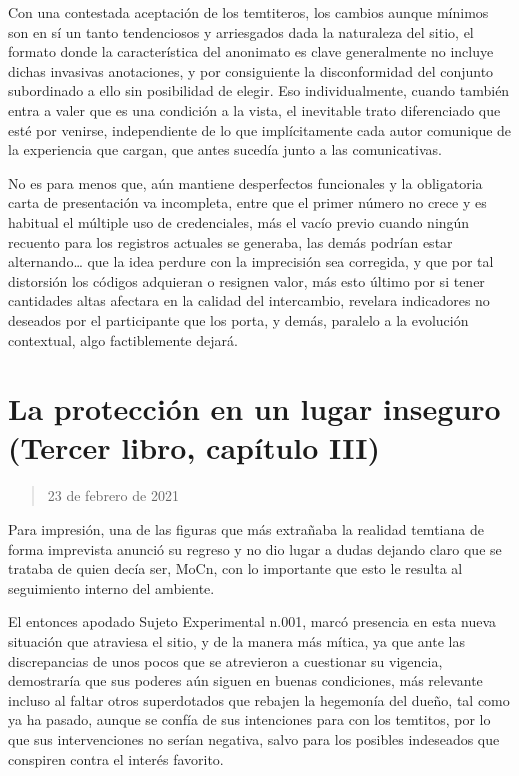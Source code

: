 \documentclass[
]{book}
\begin{document}
Con una contestada aceptación de los temtiteros, los cambios aunque mínimos son en sí un tanto tendenciosos y arriesgados dada la naturaleza del sitio, el formato donde la característica del anonimato es clave generalmente no incluye dichas invasivas anotaciones, y por consiguiente la disconformidad del conjunto subordinado a ello sin posibilidad de elegir. Eso individualmente, cuando también entra a valer que es una condición a la vista, el inevitable trato diferenciado que esté por venirse, independiente de lo que implícitamente cada autor comunique de la experiencia que cargan, que antes sucedía junto a las comunicativas.

No es para menos que, aún mantiene desperfectos funcionales y la obligatoria carta de presentación va incompleta, entre que el primer número no crece y es habitual el múltiple uso de credenciales, más el vacío previo cuando ningún recuento para los registros actuales se generaba, las demás podrían estar alternando\ldots{} que la idea perdure con la imprecisión sea corregida, y que por tal distorsión los códigos adquieran o resignen valor, más esto último por si tener cantidades altas afectara en la calidad del intercambio, revelara indicadores no deseados por el participante que los porta, y demás, paralelo a la evolución contextual, algo factiblemente dejará.

\hypertarget{la-protecciuxf3n-en-un-lugar-inseguro-tercer-libro-capuxedtulo-iii}{%
\section{La protección en un lugar inseguro (Tercer libro, capítulo III)}\label{la-protecciuxf3n-en-un-lugar-inseguro-tercer-libro-capuxedtulo-iii}}

\begin{quote}
23 de febrero de 2021
\end{quote}

Para impresión, una de las figuras que más extrañaba la realidad temtiana de forma imprevista anunció su regreso y no dio lugar a dudas dejando claro que se trataba de quien decía ser, MoCn, con lo importante que esto le resulta al seguimiento interno del ambiente.

El entonces apodado Sujeto Experimental n.001, marcó presencia en esta nueva situación que atraviesa el sitio, y de la manera más mítica, ya que ante las discrepancias de unos pocos que se atrevieron a cuestionar su vigencia, demostraría que sus poderes aún siguen en buenas condiciones, más relevante incluso al faltar otros superdotados que rebajen la hegemonía del dueño, tal como ya ha pasado, aunque se confía de sus intenciones para con los temtitos, por lo que sus intervenciones no serían negativa, salvo para los posibles indeseados que conspiren contra el interés favorito.
\end{document}
